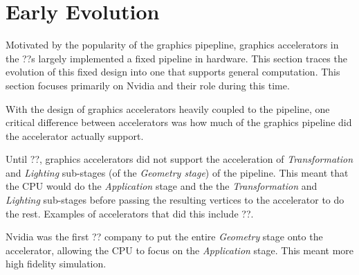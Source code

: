 \section{Early Evolution}

Motivated by the popularity of the graphics pipepline, graphics accelerators
in the ??s largely implemented a fixed pipeline in hardware. This section
traces the evolution of this fixed design into one that supports general computation.
This section focuses primarily on Nvidia and their role during this time.

With the design of graphics accelerators heavily coupled to the pipeline,
one critical difference between accelerators was how much of the
graphics pipeline did the accelerator actually support.

Until ??, graphics accelerators did not support the acceleration of
\textit{Transformation} and \textit{Lighting} sub-stages (of the
\textit{Geometry stage}) of the pipeline.
This meant that the CPU would do the \textit{Application} stage and the
the \textit{Transformation} and \textit{Lighting} sub-stages before passing
the resulting vertices to the accelerator to do the rest. Examples of accelerators
that did this include ??.

Nvidia was the first ?? company to put the entire \textit{Geometry} stage
onto the accelerator, allowing the CPU to focus on the \textit{Application}
stage. This meant more high fidelity simulation.


